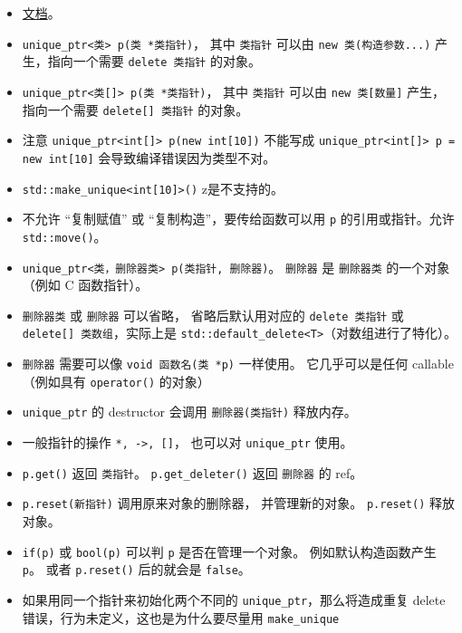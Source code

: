 \begin{itemize}
\item \href{https://en.cppreference.com/w/cpp/memory/unique_ptr}{文档}。
\item \verb`unique_ptr<类> p(类 *类指针)`， 其中 \verb`类指针` 可以由 \verb`new 类(构造参数...)` 产生，指向一个需要 \verb`delete 类指针` 的对象。
\item \verb`unique_ptr<类[]> p(类 *类指针)`， 其中 \verb`类指针` 可以由 \verb`new 类[数量]` 产生，指向一个需要 \verb`delete[] 类指针` 的对象。
\item 注意 \verb`unique_ptr<int[]> p(new int[10])` 不能写成 \verb`unique_ptr<int[]> p = new int[10]` 会导致编译错误因为类型不对。

\item \verb`std::make_unique<int[10]>()` z是不支持的。
\item 不允许 “复制赋值” 或 “复制构造”，要传给函数可以用 \verb`p` 的引用或指针。允许 \verb`std::move()`。
\item \verb`unique_ptr<类，删除器类> p(类指针, 删除器)`。 \verb`删除器` 是 \verb`删除器类` 的一个对象（例如 C 函数指针）。
\item \verb`删除器类` 或 \verb`删除器` 可以省略， 省略后默认用对应的 \verb`delete 类指针` 或 \verb`delete[] 类数组`，实际上是 \verb`std::default_delete<T>`（对数组进行了特化）。
\item \verb`删除器` 需要可以像 \verb`void 函数名(类 *p)` 一样使用。 它几乎可以是任何 callable（例如具有 \verb`operator()` 的对象）
\item \verb`unique_ptr` 的 destructor 会调用 \verb`删除器(类指针)` 释放内存。
\item 一般指针的操作 \verb`*, ->, []`， 也可以对 \verb`unique_ptr` 使用。
\item \verb`p.get()` 返回 \verb`类指针`。 \verb`p.get_deleter()` 返回 \verb`删除器` 的 ref。
\item \verb`p.reset(新指针)` 调用原来对象的删除器， 并管理新的对象。 \verb`p.reset()` 释放对象。
\item \verb`if(p)` 或 \verb`bool(p)` 可以判 \verb`p` 是否在管理一个对象。 例如默认构造函数产生 \verb`p`。 或者 \verb`p.reset()` 后的就会是 \verb`false`。
\item 如果用同一个指针来初始化两个不同的 \verb`unique_ptr`，那么将造成重复 delete 错误，行为未定义，这也是为什么要尽量用 \verb`make_unique`
\end{itemize}


